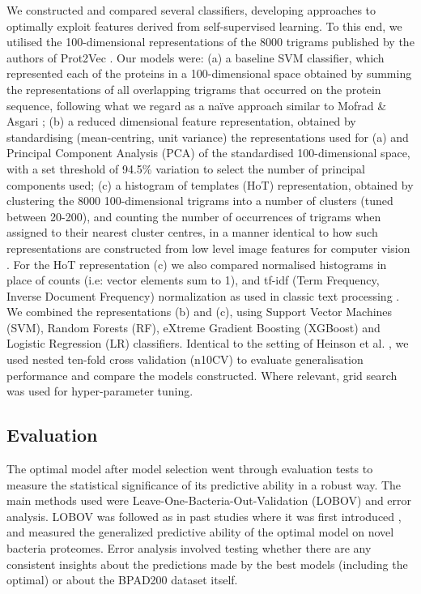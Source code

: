 \documentclass[10pt,journal,compsoc,twoside]{IEEEtran}
\begin{document}
We constructed and compared several classifiers, developing approaches to optimally exploit features derived from self-supervised learning. To this end, we utilised the 100-dimensional representations of the 8000 trigrams published by the authors of Prot2Vec \cite{protvec}. Our models were: (a) a baseline SVM classifier, which represented each of the proteins in a 100-dimensional space obtained by summing the representations of all overlapping trigrams that occurred on the protein sequence, following what we regard as a naïve approach similar to Mofrad & Asgari \cite{protvec}; (b) a reduced dimensional feature representation, obtained by standardising (mean-centring, unit variance) the representations used for (a) and Principal Component Analysis (PCA) of the standardised 100-dimensional space, with a set threshold of 94.5\% variation to select the number of principal components used; (c) a histogram of templates (HoT) representation, obtained by clustering the 8000 100-dimensional trigrams into a number of clusters (tuned between 20-200), and counting the number of occurrences of trigrams when assigned to their nearest cluster centres, in a manner identical to how such representations are constructed from low level image features for computer vision \cite{bovw-computer-vision}. For the HoT representation (c) we also compared normalised histograms in place of counts (i.e: vector elements sum to 1), and tf-idf (Term Frequency, Inverse Document Frequency) normalization as used in classic text processing \cite{tf-idf}. We combined the representations (b) and (c), using Support Vector Machines (SVM), Random Forests (RF), eXtreme Gradient Boosting (XGBoost) and Logistic Regression (LR) classifiers. Identical to the setting of Heinson et al. \cite{heinson_2017}, we used nested ten-fold cross validation (n10CV) to evaluate generalisation performance and compare the models constructed. Where relevant, grid search was used for hyper-parameter tuning. 


\subsection{Evaluation}
\label{sec:methods3}

The optimal model after model selection went through evaluation tests to measure the statistical significance of its predictive ability in a robust way. The main methods used were Leave-One-Bacteria-Out-Validation (LOBOV) and error analysis. LOBOV was followed as in past studies where it was first introduced \cite{heinson_2019}, and measured the generalized predictive ability of the optimal model on novel bacteria proteomes. Error analysis involved testing whether there are any consistent insights about the predictions made by the best models (including the optimal) or about the BPAD200 dataset itself.
\end{document}
